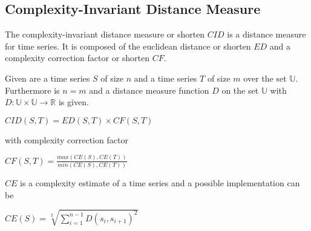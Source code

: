 \subsection{Complexity-Invariant Distance Measure}
The complexity-invariant distance measure \cite{batista2011complexity} or shorten $CID$ is a distance measure for time
series. It is composed of the euclidean distance or shorten $ED$ and a complexity correction factor or shorten $CF$.

Given are a time series $S$ of size $n$ and a time series $T$ of size $m$ over the set $\mathbb{U}$. Furthermore is
$n = m$ and a distance measure function $D$ on the set $\mathbb{U}$ with
$D: \mathbb{U} \times \mathbb{U} \to \mathbb{R}$ is given.
\begin{center}
    $CID(S, T) = ED(S, T) \times CF(S, T)$
\end{center}
with complexity correction factor
\begin{center}
    $CF(S, T) = \frac{max(CE(S), CE(T))}{min(CE(S), CE(T))}$
\end{center}
$CE$ is a complexity estimate of a time series and a possible implementation can be
\begin{center}
    $CE(S) = \sqrt[2]{\sum \limits_{i=1}^{n-1} D(s_i, s_{i + 1})^2}$
\end{center}
